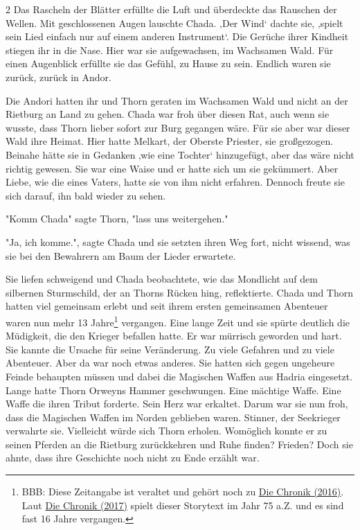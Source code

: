 \documentclass[10pt, a4paper, oneside]{book}
\begin{document}
\begin{multicols}{2}
Das Rascheln der Blätter erfüllte die Luft und überdeckte das Rauschen der Wellen. Mit geschlossenen Augen lauschte Chada. ‚Der Wind‘ dachte sie, ‚spielt sein Lied einfach nur auf einem anderen Instrument‘. Die Gerüche ihrer Kindheit stiegen ihr in die Nase. Hier war sie aufgewachsen, im Wachsamen Wald. Für einen Augenblick erfüllte sie das Gefühl, zu Hause zu sein. Endlich waren sie zurück, zurück in Andor.

Die Andori hatten ihr und Thorn geraten im Wachsamen Wald und nicht an der Rietburg an Land zu gehen. Chada war froh über diesen Rat, auch wenn sie wusste, dass Thorn lieber sofort zur Burg gegangen wäre. Für sie aber war dieser Wald ihre Heimat. Hier hatte Melkart, der Oberste Priester, sie großgezogen. Beinahe hätte sie in Gedanken ‚wie eine Tochter‘ hinzugefügt, aber das wäre nicht richtig gewesen. Sie war eine Waise und er hatte sich um sie gekümmert. Aber Liebe, wie die eines Vaters, hatte sie von ihm nicht erfahren. Dennoch freute sie sich darauf, ihn bald wieder zu sehen.

"Komm Chada" sagte Thorn, "lass uns weitergehen."

"Ja, ich komme.", sagte Chada und sie setzten ihren Weg fort, nicht wissend, was sie bei den Bewahrern am Baum der Lieder erwartete.

Sie liefen schweigend und Chada beobachtete, wie das Mondlicht auf dem silbernen Sturmschild, der an Thorns Rücken hing, reflektierte. Chada und Thorn hatten viel gemeinsam erlebt und seit ihrem ersten gemeinsamen Abenteuer waren nun mehr 13 Jahre\footnote{BBB: Diese Zeitangabe ist veraltet und gehört noch zu \hyperref[produkt-2016-die-chronik]{Die Chronik (2016)}. Laut \hyperref[produkt-2017-die-chronik]{Die Chronik (2017)} spielt dieser Storytext im Jahr 75 a.Z. und es sind fast 16 Jahre vergangen.} vergangen. Eine lange Zeit und sie spürte deutlich die Müdigkeit, die den Krieger befallen hatte. Er war mürrisch geworden und hart. Sie kannte die Ursache für seine Veränderung. Zu viele Gefahren und zu viele Abenteuer. Aber da war noch etwas anderes. Sie hatten sich gegen ungeheure Feinde behaupten müssen und dabei die Magischen Waffen aus Hadria eingesetzt. Lange hatte Thorn Orweyns Hammer geschwungen. Eine mächtige Waffe. Eine Waffe die ihren Tribut forderte. Sein Herz war erkaltet. Darum war sie nun froh, dass die Magischen Waffen im Norden geblieben waren. Stinner, der Seekrieger verwahrte sie. Vielleicht würde sich Thorn erholen. Womöglich konnte er zu seinen Pferden an die Rietburg zurückkehren und Ruhe finden? Frieden? Doch sie ahnte, dass ihre Geschichte noch nicht zu Ende erzählt war.


\end{multicols}
\end{document}

